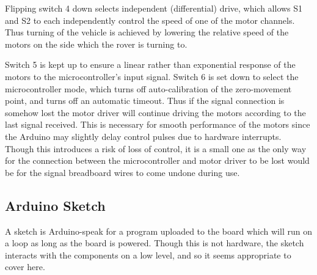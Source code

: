 Flipping switch 4 down selects independent (differential) drive, which allows S1 and S2 to each independently control the speed of one of the motor channels. Thus turning of the vehicle is achieved by lowering the relative speed of the motors on the side which the rover is turning to.

Switch 5 is kept up to ensure a linear rather than exponential response of the motors to the microcontroller's input signal. Switch 6 is set down to select the microcontroller mode, which turns off auto-calibration of the zero-movement point, and turns off an automatic timeout. Thus if the signal connection is somehow lost the motor driver will continue driving the motors according to the last signal received. This is necessary for smooth performance of the motors since the Arduino may slightly delay control pulses due to hardware interrupts. Though this introduces a risk of loss of control, it is a small one as the only way for the connection between the microcontroller and motor driver to be lost would be for the signal breadboard wires to come undone during use.

\subsection{Arduino Sketch}
A sketch is Arduino-speak for a program uploaded to the board which will run on a loop as long as the board is powered. Though this is not hardware, the sketch interacts with the components on a low level, and so it seems appropriate to cover here.

%


